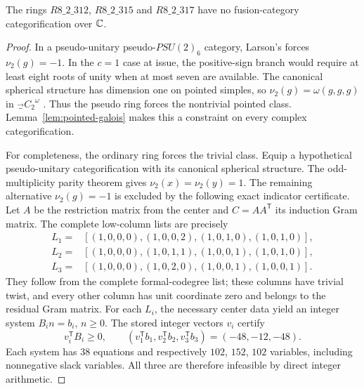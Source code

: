 \begin{proposition}\label{prop:pointed-three}
The rings $R8\_2\_312$, $R8\_2\_315$ and $R8\_2\_317$ have no
fusion-category categorification over $\mathbb C$.
\end{proposition}
\begin{proof}
In a pseudo-unitary pseudo-$PSU(2)_6$ category, Larson's
\cite[Proposition~5.5 and proof of Theorem~5.8, Case~1(c)(1)]{Larson}
forces $\nu_2(g)=-1$. In the $c=1$ case at issue, the positive-sign
branch would require at least eight roots of unity when at most seven
are available. The canonical spherical structure has dimension one
on pointed simples, so $\nu_2(g)=\omega(g,g,g)$ in
$\Vec_{C_2}^{\omega}$ \cite{NgIndicators}. Thus the pseudo ring forces
the nontrivial pointed class. Lemma~\ref{lem:pointed-galois} makes
this a constraint on every complex categorification.

For completeness, the ordinary ring forces the trivial class. Equip
a hypothetical pseudo-unitary categorification with its canonical
spherical structure. The odd-multiplicity parity theorem
\cite[Theorem~3.9]{TPEParity} gives $\nu_2(x)=\nu_2(y)=1$.
The remaining alternative $\nu_2(g)=-1$ is excluded by the following
exact indicator certificate. Let $A$ be the restriction matrix from
the center and $C=AA^{\mathsf T}$ its induction Gram matrix. The
complete low-column lists are precisely
\[
\begin{split}
L_1={}&[(1,0,0,0),(1,0,0,2),(1,0,1,0),(1,0,1,0)],\\
L_2={}&[(1,0,0,0),(1,0,1,1),(1,0,0,1),(1,0,1,0)],\\
L_3={}&[(1,0,0,0),(1,0,2,0),(1,0,0,1),(1,0,0,1)].
\end{split}
\]
They follow from the complete formal-codegree list; these columns have
trivial twist, and every other column has unit coordinate zero and
belongs to the residual Gram matrix. For each $L_i$, the necessary
center data yield an integer system $B_i n=b_i$, $n\geq0$.
The stored integer vectors $v_i$ certify
\[
v_i^{\mathsf T}B_i\geq0,\qquad
(v_1^{\mathsf T}b_1,v_2^{\mathsf T}b_2,v_3^{\mathsf T}b_3)
=(-48,-12,-48).
\]
Each system has $38$ equations and respectively $102$, $152$, $102$
variables, including nonnegative slack variables. All three are
therefore infeasible by direct integer arithmetic.


\end{proof}
